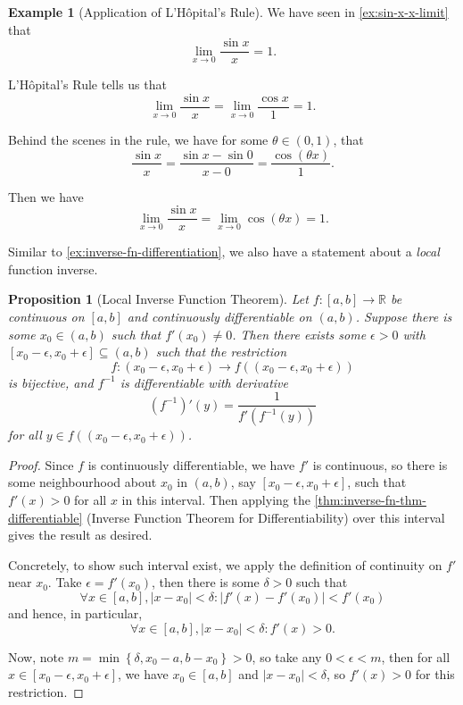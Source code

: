 \documentclass[11pt]{article}
\numberwithin{equation}{section}
\newtheorem{proposition}[theorem]{Proposition}
\theoremstyle{definition}
\newtheorem{example}[theorem]{Example}
\theoremstyle{remark}
\newcommand{\pqty}[1]{\left(#1\right)}
\newcommand{\Bqty}[1]{\left\{#1\right\}}
\newcommand{\abs}[1]{\left|#1\right|}
\newcommand{\ccintv}[2]{[#1,#2]}
\newcommand{\oointv}[2]{(#1,#2)}
\newcommand{\functiondomain}[3]{#1:#2\to #3}
\newcommand{\RR}{\mathbb R}
\newcommand{\inverse}{^{-1}}
\begin{document}
\begin{example}[Application of L'H\^{o}pital's Rule]\label{analysis-unit-0121}
    \label{ex:l-hopitals}%
    We have seen in \autoref{ex:sin-x-x-limit} that
    \[
        \lim_{x \to 0} \frac{\sin x}{x} = 1.
    \]

    L'H\^{o}pital's Rule tells us that
    \[
        \lim_{x \to 0} \frac{\sin x}{x} = \lim_{x \to 0} \frac{\cos x}{1} = 1.
    \]

    Behind the scenes in the rule, we have for some \(\theta \in \oointv{0}{1}\), that
    \[
        \frac{\sin x}{x} = \frac{\sin x - \sin 0}{x - 0} = \frac{\cos \pqty{\theta x}}{1}.
    \]
    
    Then we have
    \[
        \lim_{x \to 0} \frac{\sin x}{x} = \lim_{x \to 0} \cos \pqty{\theta x} = 1.
    \]
\end{example}

Similar to \autoref{ex:inverse-fn-differentiation}, we also have a statement about a \emph{local} function inverse.

\begin{proposition}[Local Inverse Function Theorem]\label{analysis-unit-0122}
    \label{prop:local-ivt}%
    Let \(\functiondomain{f}{\ccintv{a}{b}}{\RR}\) be continuous on \(\ccintv{a}{b}\) and continuously differentiable on \(\oointv{a}{b}\). Suppose there is some \(x_0 \in \oointv{a}{b}\) such that \(f'\pqty{x_0} \neq 0\). Then there exists some \(\epsilon > 0\) with \(\ccintv{x_0 - \epsilon}{x_0 + \epsilon} \subseteq \oointv{a}{b}\) such that the restriction
    \[
        \functiondomain{f}{\oointv{x_0 - \epsilon}{x_0 + \epsilon}}{f\pqty{\oointv{x_0 - \epsilon}{x_0 + \epsilon}}}
    \]
    is bijective, and \(f\inverse\) is differentiable with derivative
    \[
        \pqty{f\inverse}'\pqty{y} = \frac{1}{f'\pqty{f\inverse\pqty{y}}}
    \]
    for all \(y \in f\pqty{\oointv{x_0 - \epsilon}{x_0 + \epsilon}}\).
\end{proposition}

\begin{proof}
    Since \(f\) is continuously differentiable, we have \(f'\) is continuous, so there is some neighbourhood about \(x_0\) in \(\oointv{a}{b}\), say \(\ccintv{x_0 - \epsilon}{x_0 + \epsilon}\), such that \(f'\pqty{x} > 0\) for all \(x\) in this interval. Then applying the \autoref{thm:inverse-fn-thm-differentiable} (Inverse Function Theorem for Differentiability) over this interval gives the result as desired.

    Concretely, to show such interval exist, we apply the definition of continuity on \(f'\) near \(x_0\). Take \(\epsilon = f'\pqty{x_0}\), then there is some \(\delta > 0\) such that
    \[
        \forall x \in \ccintv{a}{b}, \abs{x - x_0} < \delta: \abs{f'\pqty{x} - f'\pqty{x_0}} < f'\pqty{x_0}
    \]
    and hence, in particular,
    \[
        \forall x \in \ccintv{a}{b}, \abs{x - x_0} < \delta: f'\pqty{x} > 0.
    \]

    Now, note \(m = \min\Bqty{\delta, x_0 - a, b - x_0} > 0\), so take any \(0 < \epsilon < m\), then for all \(x \in \ccintv{x_0 - \epsilon}{x_0 + \epsilon}\), we have \(x_0 \in \ccintv{a}{b}\) and \(\abs{x - x_0} < \delta\), so \(f'\pqty{x} > 0\) for this restriction.
\end{proof}
\end{document}

